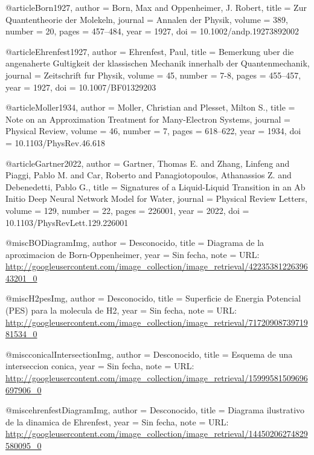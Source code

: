 @article{Born1927,
  author  = {Born, Max and Oppenheimer, J. Robert},
  title   = {Zur Quantentheorie der Molekeln},
  journal = {Annalen der Physik},
  volume  = {389},
  number  = {20},
  pages   = {457--484},
  year    = {1927},
  doi     = {10.1002/andp.19273892002}
}

@article{Ehrenfest1927,
  author  = {Ehrenfest, Paul},
  title   = {Bemerkung uber die angenaherte Gultigkeit der klassischen Mechanik innerhalb der Quantenmechanik},
  journal = {Zeitschrift fur Physik},
  volume  = {45},
  number  = {7-8},
  pages   = {455--457},
  year    = {1927},
  doi     = {10.1007/BF01329203}
}

@article{Moller1934,
  author  = {Moller, Christian and Plesset, Milton S.},
  title   = {Note on an Approximation Treatment for Many-Electron Systems},
  journal = {Physical Review},
  volume  = {46},
  number  = {7},
  pages   = {618--622},
  year    = {1934},
  doi     = {10.1103/PhysRev.46.618}
}

@article{Gartner2022,
  author  = {Gartner, Thomas E. and Zhang, Linfeng and Piaggi, Pablo M. and Car, Roberto and Panagiotopoulos, Athanassios Z. and Debenedetti, Pablo G.},
  title   = {Signatures of a Liquid-Liquid Transition in an Ab Initio Deep Neural Network Model for Water},
  journal = {Physical Review Letters},
  volume  = {129},
  number  = {22},
  pages   = {226001},
  year    = {2022},
  doi     = {10.1103/PhysRevLett.129.226001}
}

@misc{BODiagramImg,
  author = {{Desconocido}},
  title  = {Diagrama de la aproximacion de Born-Oppenheimer},
  year   = {{Sin fecha}},
  note   = {URL: \url{http://googleusercontent.com/image_collection/image_retrieval/4223538122639643201_0}}
}

@misc{H2pesImg,
  author = {{Desconocido}},
  title  = {Superficie de Energia Potencial (PES) para la molecula de H2},
  year   = {{Sin fecha}},
  note   = {URL: \url{http://googleusercontent.com/image_collection/image_retrieval/7172090873971981534_0}}
}

@misc{conicalIntersectionImg,
  author = {{Desconocido}},
  title  = {Esquema de una interseccion conica},
  year   = {{Sin fecha}},
  note   = {URL: \url{http://googleusercontent.com/image_collection/image_retrieval/15999581509696697906_0}}
}

@misc{ehrenfestDiagramImg,
  author = {{Desconocido}},
  title  = {Diagrama ilustrativo de la dinamica de Ehrenfest},
  year   = {{Sin fecha}},
  note   = {URL: \url{http://googleusercontent.com/image_collection/image_retrieval/14450206274829580095_0}}
}

